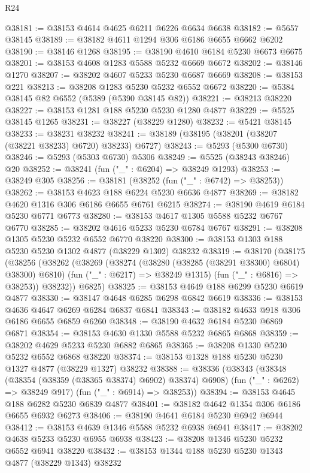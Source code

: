 \begin{lexlean}{R24}
\begin{coremodule}
@38181 := @38153 @4614 @4625 @6211 @6226 @6634 @6638
@38182 := @5657 @38145
@38189 := @38182 @4611 @1294 @306 @6186 @6655 @6662 @6202
@38190 := @38146 @1268
@38195 := @38190 @4610 @6184 @5230 @6673 @6675
@38201 := @38153 @4608 @1283 @5588 @5232 @6669 @6672
@38202 := @38146 @1270
@38207 := @38202 @4607 @5233 @5230 @6687 @6669
@38208 := @38153 @221
@38213 := @38208 @1283 @5230 @5232 @6552 @6672
@38220 := @5384 @38145 @82 @6552 (@5389 (@5390 @38145 @82))
@38221 := @38213 @38220
@38227 := @38153 @1281 @188 @5230 @5230 @1280 @4877
@38229 := @5525 @38145 @1265
@38231 := @38227 (@38229 @1280)
@38232 := @5421 @38145
@38233 := @38231 @38232
@38241 := @38189 (@38195 (@38201 (@38207 (@38221 @38233) @6720) @38233) @6727)
@38243 := @5293 (@5300 @6730)
@38246 := @5293 (@5303 @6730) @5306
@38249 := @5525 (@38243 @38246) @20
@38252 := @38241 (fun ("_" : @6204) => @38249 @1293)
@38253 := @38249 @305
@38256 := @38181 (@38252 (fun ("_" : @6742) => @38253))
@38262 := @38153 @4623 @188 @6224 @5230 @6636 @4877
@38269 := @38182 @4620 @1316 @306 @6186 @6655 @6761 @6215
@38274 := @38190 @4619 @6184 @5230 @6771 @6773
@38280 := @38153 @4617 @1305 @5588 @5232 @6767 @6770
@38285 := @38202 @4616 @5233 @5230 @6784 @6767
@38291 := @38208 @1305 @5230 @5232 @6552 @6770 @38220
@38300 := @38153 @1303 @188 @5230 @5230 @1302 @4877 (@38229 @1302) @38232
@38319 := @38170
    (@38175
      (@38256
        (@38262
          (@38269
            (@38274 (@38280 (@38285 (@38291 @38300) @6804) @38300) @6810)
            (fun ("_" : @6217) => @38249 @1315)
            (fun ("_" : @6816) => @38253))
          @38232))
      @6825)
@38325 := @38153 @4649 @188 @6299 @5230 @6619 @4877
@38330 := @38147 @4648 @6285 @6298 @6842 @6619
@38336 := @38153 @4636 @4647 @6269 @6284 @6837 @6841
@38343 := @38182 @4633 @918 @306 @6186 @6655 @6859 @6260
@38348 := @38190 @4632 @6184 @5230 @6869 @6871
@38354 := @38153 @4630 @1330 @5588 @5232 @6865 @6868
@38359 := @38202 @4629 @5233 @5230 @6882 @6865
@38365 := @38208 @1330 @5230 @5232 @6552 @6868 @38220
@38374 := @38153 @1328 @188 @5230 @5230 @1327 @4877 (@38229 @1327) @38232
@38388 := @38336
    (@38343
      (@38348 (@38354 (@38359 (@38365 @38374) @6902) @38374) @6908)
      (fun ("_" : @6262) => @38249 @917)
      (fun ("_" : @6914) => @38253))
@38394 := @38153 @4645 @188 @6282 @5230 @6839 @4877
@38401 := @38182 @4642 @1354 @306 @6186 @6655 @6932 @6273
@38406 := @38190 @4641 @6184 @5230 @6942 @6944
@38412 := @38153 @4639 @1346 @5588 @5232 @6938 @6941
@38417 := @38202 @4638 @5233 @5230 @6955 @6938
@38423 := @38208 @1346 @5230 @5232 @6552 @6941 @38220
@38432 := @38153 @1344 @188 @5230 @5230 @1343 @4877 (@38229 @1343) @38232

\end{coremodule}
\end{lexlean}
